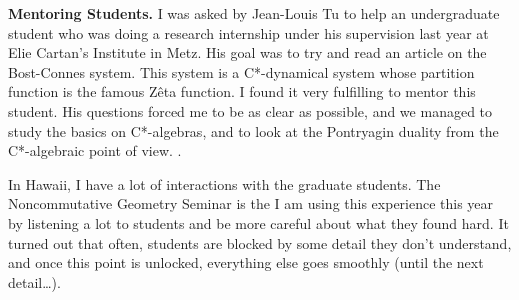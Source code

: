 \documentclass[a4paper]{article}
\begin{document}
\textbf{Mentoring Students.} I was asked by Jean-Louis Tu to help an undergraduate student who was doing a research internship under his supervision last year at Elie Cartan’s Institute in Metz. His goal was to try and read an article on the Bost-Connes system. This system is a C*-dynamical system whose partition function is the famous Zêta function. I found it very fulfilling to mentor this student. His questions forced me to be as clear as possible, and we managed to study the basics on C*-algebras, and to look at the Pontryagin duality from the C*-algebraic point of view. .

In Hawaii, I have a lot of interactions with the graduate students. The Noncommutative Geometry Seminar is the   
I am using this experience this year by listening a lot to students and be more careful about what they found hard. It turned out that often, students are blocked by some detail they don’t understand, and once this point is unlocked, everything else goes smoothly (until the next detail…).\\


 
\end{document}
